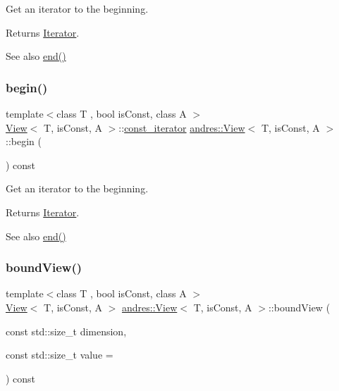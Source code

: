 Get an iterator to the beginning.

\begin{DoxyReturn}{Returns}
\hyperlink{classandres_1_1Iterator}{Iterator}. 
\end{DoxyReturn}
\begin{DoxySeeAlso}{See also}
\hyperlink{classandres_1_1View_af778a1e9839f2f90e503514e36d41b78}{end()} 
\end{DoxySeeAlso}
\mbox{\label{classandres_1_1View_a87da961e49db2ffdcdf412275b935121}} 
\subsubsection{\texorpdfstring{begin()}{begin()}\hspace{0.1cm}{\footnotesize\ttfamily [2/2]}}
{\footnotesize\ttfamily template$<$class T , bool is\+Const, class A $>$ \\
\hyperlink{classandres_1_1View}{View}$<$ T, is\+Const, A $>$\+::\hyperlink{classandres_1_1View_a7b6f125a7b3830f30cd34887b61858a7}{const\+\_\+iterator} \hyperlink{classandres_1_1View}{andres\+::\+View}$<$ T, is\+Const, A $>$\+::begin (\begin{DoxyParamCaption}{ }\end{DoxyParamCaption}) const\hspace{0.3cm}{\ttfamily [inline]}}

Get an iterator to the beginning.

\begin{DoxyReturn}{Returns}
\hyperlink{classandres_1_1Iterator}{Iterator}. 
\end{DoxyReturn}
\begin{DoxySeeAlso}{See also}
\hyperlink{classandres_1_1View_af778a1e9839f2f90e503514e36d41b78}{end()} 
\end{DoxySeeAlso}
\mbox{\label{classandres_1_1View_afedd24824bbb3ada02cb5344468d8bb8}} 
\subsubsection{\texorpdfstring{bound\+View()}{boundView()}}
{\footnotesize\ttfamily template$<$class T , bool is\+Const, class A $>$ \\
\hyperlink{classandres_1_1View}{View}$<$ T, is\+Const, A $>$ \hyperlink{classandres_1_1View}{andres\+::\+View}$<$ T, is\+Const, A $>$\+::bound\+View (\begin{DoxyParamCaption}\item[{const std\+::size\+\_\+t}]{dimension,  }\item[{const std\+::size\+\_\+t}]{value = {} }\end{DoxyParamCaption}) const}

